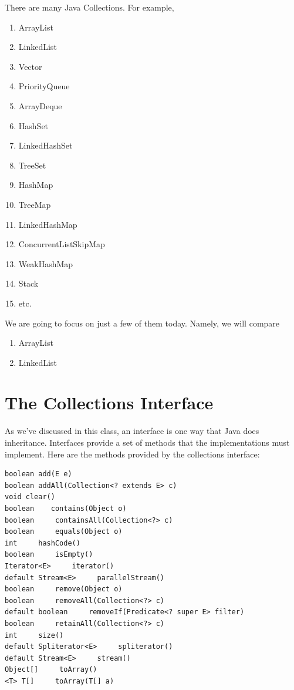 \documentclass[10pt]{article}
\begin{document}
There are many Java Collections. For example, 

\begin{enumerate}
\item ArrayList
\item LinkedList
\item Vector
\item PriorityQueue
\item ArrayDeque
\item HashSet
\item LinkedHashSet
\item TreeSet
\item HashMap
\item TreeMap
\item LinkedHashMap
\item ConcurrentListSkipMap
\item WeakHashMap
\item Stack
\item etc.
\end{enumerate}

We are going to focus on just a few of them today. Namely, we will compare

\begin{enumerate}
\item ArrayList
\item LinkedList
\end{enumerate}


\section{The Collections Interface}
As we've discussed in this class, an interface is one way that Java does
inheritance. Interfaces provide a set of methods that the implementations must
implement. Here are the methods provided by the collections interface:

\begin{lstlisting}[style=java]
boolean add(E e)
boolean addAll(Collection<? extends E> c)
void clear()
boolean    contains(Object o)
boolean     containsAll(Collection<?> c)
boolean     equals(Object o)
int     hashCode()
boolean     isEmpty()
Iterator<E>     iterator()
default Stream<E>     parallelStream()
boolean     remove(Object o)
boolean     removeAll(Collection<?> c)
default boolean     removeIf(Predicate<? super E> filter)
boolean     retainAll(Collection<?> c)
int     size()
default Spliterator<E>     spliterator()
default Stream<E>     stream()
Object[]     toArray()
<T> T[]     toArray(T[] a)
\end{lstlisting}
\end{document}
